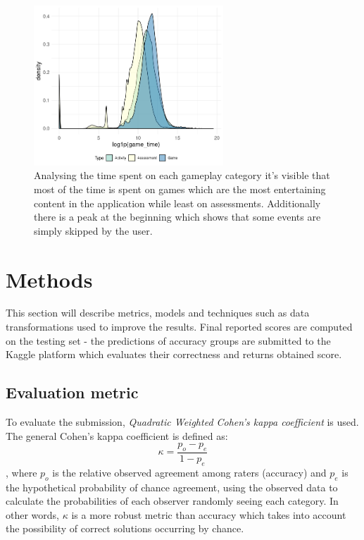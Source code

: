 \documentclass[fleqn,10pt]{SelfArx} %
\begin{document}
\begin{figure}
    \centering
    \includegraphics[width=\linewidth,height=6cm]{images/activity_time.png}
    \caption{Analysing the time spent on each gameplay category it's visible that most of the time is spent on games which are the most entertaining content in the application while least on assessments. Additionally there is a peak at the beginning which shows that some events are simply skipped by the user.}
    \label{fig:activity-time}
\end{figure}


\section{Methods}

This section will describe metrics, models and techniques such as data transformations used to improve the results.
Final reported scores are computed on the testing set - the predictions of accuracy groups are submitted to the Kaggle platform which evaluates their correctness and returns obtained score.

\subsection{Evaluation metric}

To evaluate the submission, \textit{Quadratic Weighted Cohen's kappa coefficient} is used.
The general Cohen's kappa coefficient is defined as:
\begin{equation}
    \kappa = \frac{p_o - p_e}{1 - p_e}
    \label{eq:kappa}
\end{equation}
, where $p_o$ is the relative observed agreement among raters (accuracy) and $p_e$ is the hypothetical probability of chance agreement, using the observed data to calculate the probabilities of each observer randomly seeing each category.
In other words, $\kappa$ is a more robust metric than accuracy which takes into account the possibility of correct solutions occurring by chance.
\end{document}
